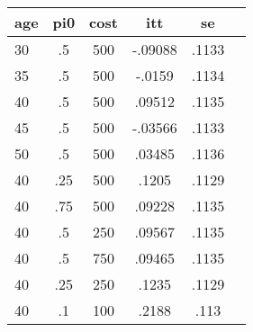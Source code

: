 \begin{table}[htbp]
\begin{tabular}{lccccc} \hline \hline
 \multicolumn{1}{c}{ age }  & pi0  & cost  & itt  & se  \\  \hline 
       30 &        .5 &       500 &   -.09088 &     .1133 \\  
       35 &        .5 &       500 &    -.0159 &     .1134 \\  
       40 &        .5 &       500 &    .09512 &     .1135 \\  
       45 &        .5 &       500 &   -.03566 &     .1133 \\  
       50 &        .5 &       500 &    .03485 &     .1136 \\  
       40 &       .25 &       500 &     .1205 &     .1129 \\  
       40 &       .75 &       500 &    .09228 &     .1135 \\  
       40 &        .5 &       250 &    .09567 &     .1135 \\  
       40 &        .5 &       750 &    .09465 &     .1135 \\  
       40 &       .25 &       250 &     .1235 &     .1129 \\  
       40 &        .1 &       100 &     .2188 &      .113 \\  
\hline \hline \end{tabular}
\end{table}
